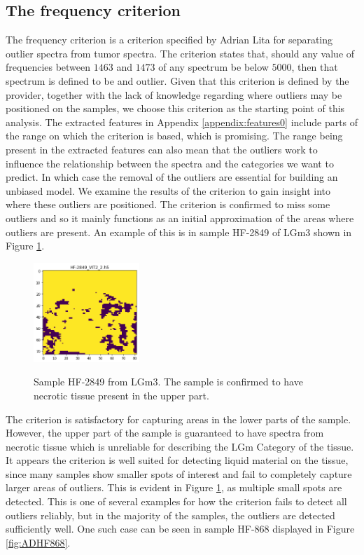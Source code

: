 \subsection{The frequency criterion}

The frequency criterion is a criterion specified by Adrian Lita for separating outlier spectra from tumor spectra. The criterion states that, should any value of frequencies between $1463$ and $1473$ of any spectrum be below $5000$, then that spectrum is defined to be and outlier. Given that this criterion is defined by the provider, together with the lack of knowledge regarding where outliers may be positioned on the samples, we choose this criterion as the starting point of this analysis. The extracted features in Appendix \ref{appendix:features0} include parts of the range on which the criterion is based, which is promising. The range being present in the extracted features can also mean that the outliers work to influence the relationship between the spectra and the categories we want to predict. In which case the removal of the outliers are essential for building an unbiased model. We examine the results of the criterion to gain insight into where these outliers are positioned. The criterion is confirmed to miss some outliers and so it mainly functions as an initial approximation of the areas where outliers are present. An example of this is in sample HF-2849 of LGm3 shown in Figure \ref{fig:HF2849_1}.

\begin{figure}[H]

    \centering
{\includegraphics[width=4cm]{images/AdriansCriterion/LGm-3/HF-2849_VIT2_2.h5_5.png} }
\caption{Sample HF-2849 from LGm3. The sample is confirmed to have necrotic tissue present in the upper part.\label{fig:HF2849_1}}%

\end{figure}

The criterion is satisfactory for capturing areas in the lower parts of the sample. However, the upper part of the sample is guaranteed to have spectra from necrotic tissue which is unreliable for describing the LGm Category of the tissue. It appears the criterion is well suited for detecting liquid material on the tissue, since many samples show smaller spots of interest and fail to completely capture larger areas of outliers. This is evident in Figure \ref{fig:HF2849_1}, as multiple small spots are detected. This is one of several examples for how the criterion fails to detect all outliers reliably, but in the majority of the samples, the outliers are detected sufficiently well. One such case can be seen in sample HF-868 displayed in Figure \ref{fig:ADHF868}.

